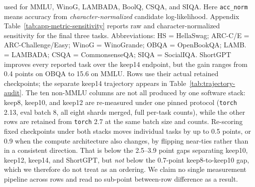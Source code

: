 \begin{table}[t]
{used for MMLU, WinoG, LAMBADA, BoolQ, CSQA, and SIQA. Here
\texttt{acc\_norm} means accuracy from \emph{character-normalized} candidate
log-likelihood. Appendix Table~\ref{tab:app-metric-sensitivity} reports raw
and character-normalized sensitivity for the final three tasks. Abbreviations: HS = HellaSwag;
ARC-C/E = ARC-Challenge/Easy; WinoG = WinoGrande; OBQA = OpenBookQA; LAMB. =
LAMBADA; CSQA = CommonsenseQA; SIQA = SocialIQA. ShortGPT improves every
reported task over the keep14 endpoint, but the gain ranges from 0.4 points on
OBQA to 15.6 on MMLU. Rows use their actual retained checkpoints; the separate keep14 trajectory appears in Table~\ref{tab:trajectory-audit}.
The ten non-MMLU columns are not all produced by one software stack: keep8,
keep10, and keep12 are re-measured under one pinned protocol (\texttt{torch}
2.13, eval batch 8, all eight shards merged, full per-task counts), while the
other rows are retained from \texttt{torch} 2.7 at the same batch size and
counts. Re-scoring fixed checkpoints under both stacks moves individual tasks by
up to 0.5 points, or 0.9 when the compute architecture also changes, by flipping
near-ties rather than in a consistent direction. That is below the 2.5--3.9
point gaps separating keep10, keep12, keep14, and ShortGPT, but \emph{not} below
the 0.7-point keep8-to-keep10 gap, which we therefore do not treat as an
ordering. We claim no single measurement pipeline across rows and read no
sub-point between-row difference as a result.}
\label{tab:downstream}
\end{table}
